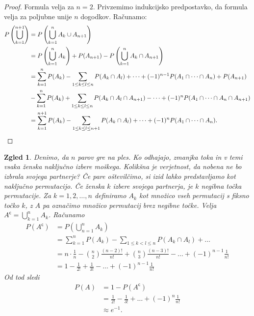 \documentclass[10pt, a4paper]{article}
\newtheorem{zgled}[izr]{Zgled}
\newenvironment{noticeC}{%
  \tcolorbox[%
  notitle,
  empty,
  enhanced,  %
  breakable,
  coltext=black, 
  fontupper=\rmfamily,
  parbox=false,
  noparskip,
  sharp corners,
  boxrule=-1pt,  %
  frame hidden,
  left=7pt,  %
  right=7pt,
  top=5pt,
  bottom=5pt,
  before skip=2.5ex plus 2pt,
  after skip=2.5ex plus 2pt,
  overlay unbroken and last={%
  },
  ]}
{\endtcolorbox}
\newenvironment{dokaz}%
  {\begin{noticeC}\begin{proof}}%
  {\end{proof}\end{noticeC}}
\newcommand{\stcomp}[1]{{#1}^{\mathsf{c}}}
\begin{document}
\begin{dokaz}
    Formula velja za $n = 2$. Privzemimo indukcijsko predpostavko, da formula velja za poljubne unije $n$ dogodkov.
    Računamo:
    \begin{align*}
        P \left(\bigcup_{k = 1} ^{n + 1}\right) &= P\left(\bigcup_{k = 1} ^n A_k \cup A_{n + 1}\right)\\
        &= P \left(\bigcup_{k = 1} ^n A_k\right) + P(A_{n + 1}) - P \left(\bigcup_{k = 1} ^n A_k \cap A_{n + 1}\right)\\
        &= \sum_{k = 1} ^n P(A_k) - \sum_{1 \leq k \leq l \leq n} P(A_k \cap A_l) + \dots + (-1)^{n - 1} P(A_1 \cap \dots \cap A_n) + P(A_{n + 1})\\
        &- \sum_{k = 1} ^n P(A_k) + \sum_{1 \leq k \leq l \leq n} P(A_k \cap A_l \cap A_{n + 1}) - \dots + (-1)^n P(A_1 \cap \dots \cap A_n \cap A_{n + 1})\\
        &= \sum_{k = 1} ^{n+1} P(A_k)- \sum_{1 \leq k \leq l \leq n + 1} P(A_k \cap A_l) + \dots + (-1)^n P(A_1 \cap \dots \cap A_n). \qedhere
    \end{align*}
\end{dokaz}

\begin{zgled}
    Denimo, da $n$ parov gre na ples. Ko odhajajo, zmanjka toka in v temi vsaka 
    ženska naključno izbere moškega. Kolikšna je verjetnost, da nobena ne bo izbrala svojega partnerje?
    Če pare oštevilčimo, si izid lahko predstavljamo kot naključno permutacijo.
    Če ženska $k$ izbere svojega partnerja, je $k$ negibna točka permutacije.
    Za $k = 1, 2, \dots, n$ definiramo $A_k$ kot množico vseh permutacij s fiksno točko $k$, z $A$ pa označimo 
    množico permutacij brez negibne točke.
    Velja $\stcomp{A} = \bigcup_{k = 1} ^n A_k$. Računamo 
    \begin{align*}
        P(\stcomp{A}) &= P \left(\bigcup_{n = 1} ^n A_k\right)\\
        &= \sum_{k = 1} ^n P(A_k) - \sum_{1 \leq k < l \leq n} P(A_k \cap A_l) + \dots\\
        &= n \cdot \frac{1}{n} - \binom{n}{2} \frac{(n - 2)!}{n!} + \binom{n}{3} \frac{(n - 3)!}{n!} - \dots + (-1)^{n - 1} \frac{1}{n!}\\
        &= 1 - \frac{1}{2!} + \frac{1}{3!} - \dots + (-1)^{n - 1} \frac{1}{n!}
    \end{align*}
    Od tod sledi 
    \begin{align*}
        P(A) &= 1 - P(\stcomp{A})\\
        &= \frac{1}{2!} - \frac{1}{3!} + \dots + (-1)^n \frac{1}{n!}\\
        &\approx e^{-1}.
    \end{align*}
\end{zgled}
\end{document}

